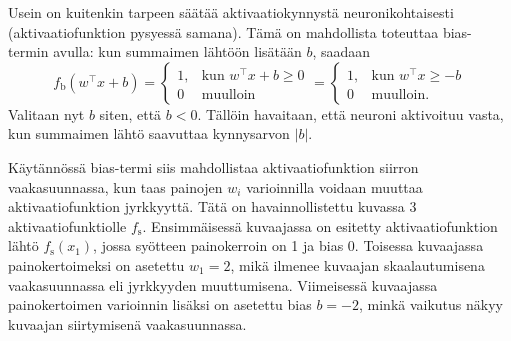 \documentclass[12pt,a4paper,finnish,oneside,titlepage]{article}
\theoremstyle{plain}
\theoremstyle{definition}
\theoremstyle{remark}
\begin{document}
Usein on kuitenkin tarpeen säätää aktivaatiokynnystä neuronikohtaisesti (aktivaatiofunktion pysyessä samana). Tämä on mahdollista toteuttaa bias-termin avulla: kun summaimen lähtöön lisätään \(b\), saadaan \[f_\text{b}\left(w^{\top} x+b\right)=\begin{cases} 1, &\text{kun }w^{\top} x+b\geq 0 \\ 0 &\text{muulloin}\end{cases}=\begin{cases} 1, &\text{kun }w^{\top} x\geq -b \\ 0 &\text{muulloin.}\end{cases}\]
Valitaan nyt \(b\) siten, että \(b<0\). Tällöin havaitaan, että neuroni aktivoituu vasta, kun summaimen lähtö saavuttaa kynnysarvon \(|b|\).

Käytännössä bias-termi siis mahdollistaa aktivaatiofunktion siirron vaakasuunnassa, kun taas painojen \(w_i\) varioinnilla voidaan muuttaa aktivaatiofunktion jyrkkyyttä. Tätä on havainnollistettu kuvassa 3 aktivaatiofunktiolle \(f_\text{s}\). Ensimmäisessä kuvaajassa on esitetty aktivaatiofunktion lähtö \(f_\text{s}(x_1)\), jossa syötteen painokerroin on 1 ja bias 0. Toisessa kuvaajassa painokertoimeksi on asetettu \(w_1=2\), mikä ilmenee kuvaajan skaalautumisena vaakasuunnassa eli jyrkkyyden muuttumisena. Viimeisessä kuvaajassa painokertoimen varioinnin lisäksi on asetettu bias \(b=-2\), minkä vaikutus näkyy kuvaajan siirtymisenä vaakasuunnassa.
\end{document}
